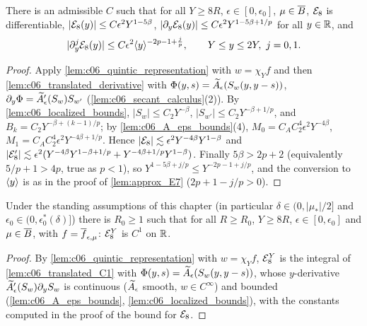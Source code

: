 \begin{lemma}[Control of $\mc E_8$]
  \label{lem:approx_E8}
  There is an admissible $C$ such that for all $Y\ge8R$, $\epsilon\in[0,\epsilon_0]$, $\mu\in\overline{B}$,
  $\mc E_8$ is differentiable, $|\mathcal{E}_8(y)|\le C\epsilon^2Y^{1-5\beta}$, $|\partial_y\mathcal{E}_8(y)|\le C\epsilon^2Y^{1-5\beta+1/p}$ for all $y\in\mathbb{R}$, and
  \[|\partial_y^j\mathcal{E}_8(y)|\le C\epsilon^2\langle y \rangle^{-2p-1+\frac jp},\qquad Y\le y\le2Y,\ j=0,1.\]
\end{lemma}
\begin{proof}
  Apply \cref{lem:c06_quintic_representation} with $w=\chi_Yf$ and then \cref{lem:c06_translated_derivative}
  with $\Phi(y,s)=\widetilde{A}_\epsilon(S_w(y,y-s))$, $\partial_y\Phi=\widetilde{A}_\epsilon'(S_w)S_{w'}$ (\cref{lem:c06_secant_calculus}(2)).
  By \cref{lem:c06_localized_bounds}, $|S_w|\le C_2Y^{-\beta}$, $|S_{w'}|\le C_2Y^{-\beta+1/p}$, and $B_k=C_2Y^{-\beta+(k-1)/p}$;
  by \cref{lem:c06_A_eps_bounds}(4), $M_0=C_AC_2^4\epsilon^2Y^{-4\beta}$, $M_1=C_AC_2^4\epsilon^2Y^{-4\beta+1/p}$.
  Hence $|\mathcal{E}_8|\lesssim\epsilon^2Y^{-4\beta}Y^{1-\beta}$ and
  $|\mathcal{E}_8'|\lesssim\epsilon^2(Y^{-4\beta}Y^{1-\beta+1/p}+Y^{-4\beta+1/p}Y^{1-\beta})$.
  Finally $5\beta>2p+2$ (equivalently $5/p+1>4p$, true as $p<1$), so $Y^{1-5\beta+j/p}\le Y^{-2p-1+j/p}$, and the
  conversion to $\langle y \rangle$ is as in the proof of \cref{lem:approx_E7} ($2p+1-j/p>0$).
\end{proof}

\begin{lemma}[$\mc E_8$ is $C^1$]
  \label{lem:c06_E8_C1}
  Under the standing assumptions of this chapter (in particular $\delta\in(0,|\mu_*|/2]$ and
  $\epsilon_0\in(0,\epsilon_0^*(\delta)]$) there is $R_0\ge1$ such that for all $R\ge R_0$, $Y\ge8R$,
  $\epsilon\in[0,\epsilon_0]$ and $\mu\in\overline{B}$, with $f=\overline{f}_{\epsilon,\mu}$: $\mathcal{E}_8^Y$ is $C^1$ on $\mathbb{R}$.
\end{lemma}
\begin{proof}
  By \cref{lem:c06_quintic_representation} with $w=\chi_Yf$, $\mathcal{E}_8^Y$ is the integral of
  \cref{lem:c06_translated_C1} with $\Phi(y,s)=\widetilde{A}_\epsilon(S_w(y,y-s))$, whose $y$-derivative
  $\widetilde{A}_\epsilon'(S_w)\partial_yS_w$ is continuous ($\widetilde{A}_\epsilon$ smooth, $w\in C^\infty$) and bounded
  (\cref{lem:c06_A_eps_bounds}, \cref{lem:c06_localized_bounds}), with the constants computed in the proof of the bound for $\mc E_8$.
\end{proof}

